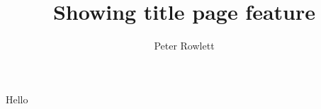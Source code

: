 \documentclass{beamer}
\title{Showing title page feature}
\author{Peter Rowlett}
\begin{document}
	
	\begin{frame}
		\titlepage
	\end{frame}
	
	\begin{frame}{Hello}
		\blindtext[1]
	\end{frame}
\end{document}
